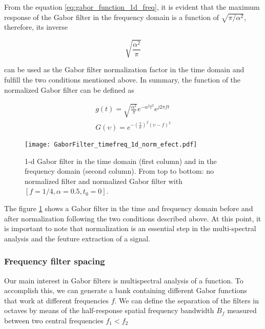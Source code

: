 From the equation \eqref{eq:gabor_function_1d_freq}, it is evident that the maximum response of the Gabor filter in the frequency domain is a function of $\sqrt{\pi/\alpha^2}$, therefore, its inverse

\begin{equation}\label{eq:normalization_factor}
    \sqrt{\frac{\alpha^2}{\pi}}
\end{equation}

can be used as the Gabor filter normalization factor in the time domain and fulfill the two conditions mentioned above. In summary, the function of the normalized Gabor filter can be defined as

\begin{equation}\label{eq:gabor_function_1d_timefreq_normalized}
    \begin{gathered}
         g(t) =  \sqrt{\frac{\alpha^2}{\pi}} e ^{-\alpha^2 t^2} e ^{j 2 \pi f t } \\
         G(\upsilon) =  e ^{-\left(\frac{\pi}{\alpha}\right) ^2 (\upsilon-f)^2}
     \end{gathered}
\end{equation}

\begin{figure}
\centering
\texttt{[image: GaborFilter\_timefreq\_1d\_norm\_efect.pdf]}
\caption{1-d Gabor filter in the time domain (first column) and in the frequency domain (second  column). From top to bottom: no normalized filter and normalized Gabor filter with $[f =1/4,\alpha=0.5, t_0=0]$.}\label{fig:GaborFilter_timefreq_norm_efect}
\end{figure}

The figure \ref{fig:GaborFilter_timefreq_norm_efect} shows a Gabor filter in the time and frequency domain before and after normalization following the two conditions described above. At this point, it is important to note that normalization is an essential step in the multi-spectral analysis and the feuture extraction of a signal.

\subsubsection{Frequency filter spacing} \label{subsec:frequency_filter_spacing}

Our main interest in Gabor filters is multispectral analysis of a function. To accomplish this, we can generate a bank containing different Gabor functions that work at different frequencies $f$. We can define the separation of the filters in octaves by means of the half-response spatial frequency bandwidth $B_f$ measured between two central frequencies $f_1 < f_2$ \cite{Granlund:CGIP:1978}  

